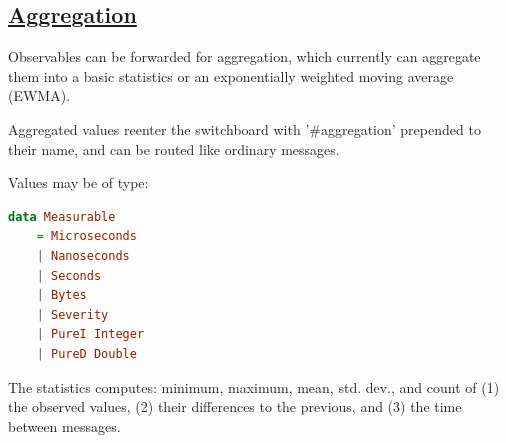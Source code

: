 \begin{mdframed}

    \section*{\href{https://github.com/input-output-hk/iohk-monitoring-framework/blob/master/iohk-monitoring/src/Cardano/BM/Data/Aggregated.lhs}{Aggregation}}

Observables can be forwarded for aggregation, which currently can aggregate them into a basic statistics or an exponentially weighted moving average (EWMA).

Aggregated values reenter the switchboard with '\#aggregation' prepended to their name, and can be routed like ordinary messages.

Values may be of type:

    \begin{lstlisting}[language=Haskell]
data Measurable
    = Microseconds
    | Nanoseconds
    | Seconds
    | Bytes
    | Severity
    | PureI Integer
    | PureD Double
    \end{lstlisting}

The statistics computes: minimum, maximum, mean, std. dev., and count of (1) the observed values, (2) their differences to the previous, and (3) the time between messages.
\end{mdframed}

